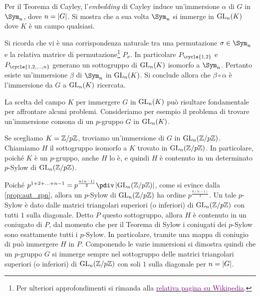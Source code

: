 \documentclass[11pt]{scrartcl}
\begin{document}
	\begin{soln}
		Per il Teorema di Cayley, l'\textit{embedding} di Cayley induce un'immersione
		$\alpha$
		di $G$ in $\Sym_n$, dove $n = \left\lvert G \right\rvert$. Si mostra che a sua volta $\Sym_n$
		si immerge in $\operatorname{GL}_n(K)$ dove $K$ è un campo qualsiasi. \medskip
		
		
		Si ricorda che vi è una corrispondenza naturale tra una permutazione $\sigma \in \Sym_n$ e la relativa matrice di permutazione\footnote{
			Per ulteriori approfondimenti si rimanda alla \href{https://it.wikipedia.org/wiki/Matrice_di_permutazione}{{\textcolor{purple}{relativa pagina su Wikipedia}}}.
		} $P_\sigma$. In particolare $P_{\cycle{1, 2}}$ e $P_{\cycle{1, 2, \ldots, n}}$
		generano un sottogruppo di $\operatorname{GL}_n(K)$ isomorfo a $\Sym_n$. Pertanto esiste
		un'immersione $\beta$ di $\Sym_n$ in $\operatorname{GL}_n(K)$.
		Si conclude allora che $\beta \circ \alpha$ è l'immersione da $G$ a
		$\operatorname{GL}_n(K)$ ricercata.
	\end{soln}
	
	\begin{approf}[$\star$]
		La scelta del campo $K$ per immergere $G$ in $\operatorname{GL}_n(K)$ può risultare fondamentale
		per affrontare alcuni problemi. Consideriamo per esempio il problema di
		trovare un'immersione consona di un $p$-gruppo $G$ in $\operatorname{GL}_n(K)$. \medskip
		
		
		Se scegliamo $K = \mathbb{Z}/{p}\mathbb{Z}$, troviamo un'immersione di $G$ in $\operatorname{GL}_n(\mathbb{Z}/{p}\mathbb{Z})$.
		Chiamiamo $H$ il sottogruppo isomorfo a $K$ trovato in $\operatorname{GL}_n(\mathbb{Z}/{p}\mathbb{Z})$.
		In particolare, poiché $K$ è un $p$-gruppo, anche $H$ lo è, e quindi
		$H$ è contenuto in un determinato $p$-Sylow di $\operatorname{GL}_n(\mathbb{Z}/{p}\mathbb{Z})$. \medskip
		
		
		Poiché $p^{1 + 2 + \ldots + n-1} = p^{\frac{n(n-1)}{2}} \pdiv \abs{\GL_n(\Z{p})}$,
		come si evince dalla \autoref{prop:aut_zpn}, allora un $p$-Sylow di $\operatorname{GL}_n(\mathbb{Z}/{p}\mathbb{Z})$ ha ordine $p^{\frac{n(n-1)}{2}}$. Un tale $p$-Sylow è
		dato dalle matrici triangolari superiori (o inferiori) di $\operatorname{GL}_n(\mathbb{Z}/{p}\mathbb{Z})$ con tutti
		$1$ sulla diagonale. Detto $P$ questo sottogruppo, allora
		$H$ è contenuto in un coniugato di $P$, dal momento che per il Teorema
		di Sylow i coniugati dei
		$p$-Sylow sono esattamente tutti i $p$-Sylow. In particolare, tramite una
		mappa di coniugio di può immergere $H$ in $P$. Componendo le varie
		immersioni si dimostra quindi che un $p$-gruppo $G$ si immerge sempre
		nel sottogruppo delle matrici triangolari superiori (o inferiori) di
		$\operatorname{GL}_n(\mathbb{Z}/{p}\mathbb{Z})$ con soli $1$ sulla diagonale per $n = \left\lvert G \right\rvert$.
	\end{approf}
	
\end{document}
